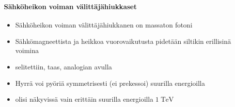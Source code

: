 \begin{frame}
\frametitle{\texorpdfstring{\culine[\sectiontitleulinecolor]{\sectiontitle}}{\sectiontitle} }
\framesubtitle{Sähköheikon voiman välittäjähiukkaset}%
\appear{}

\begin{itemize}
	\item Sähköheikon voiman välittäjähiukkanen on massaton fotoni  
	
	\item Sähkömagneettista ja heikkoa vuorovaikutusta pidetään siltikin erillisinä voimina

\item {} selitettiin, taas, analogian avulla 
\item Hyrrä voi pyöriä symmetrisesti (ei prekessoi) suurilla energioilla
\item {} olisi näkyvissä vain erittäin suurilla energioilla $1 \mathrm{\;TeV}$
\end{itemize}

\endofslide 
\end{frame}

